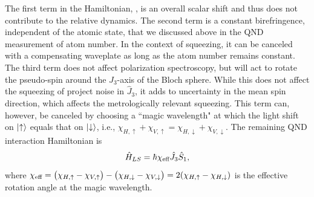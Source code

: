 \documentclass[preprint,aps,pra,onecolumn]{revtex4-1} %
\begin{document}
The first term in the Hamiltonian, , is an overall scalar shift and thus does not contribute to the relative dynamics.  The second term is a constant birefringence, independent of the atomic state, that we discussed above in the QND measurement of atom number.  In the context of squeezing, it can be canceled with a compensating waveplate as long as the atom number remains constant. The third term does not affect polarization spectroscopy, but will act to rotate the pseudo-spin around the $J_3$-axis of the Bloch sphere.  While this does not affect the squeezing of project noise in $\hat{J}_3$, it adds to uncertainty in the mean spin direction, which affects the metrologically relevant squeezing.   This term can, however, be canceled by choosing a ``magic wavelength" at which the light shift on $\lvert{\uparrow}\rangle$ equals that on $\lvert{\downarrow}\rangle$, i.e., 
$\chi_{H,\uparrow} +\chi_{V,\uparrow}  = \chi_{H,\downarrow} + \chi_{V,\downarrow}.$ The remaining QND interaction Hamiltonian is
\begin{equation}
\hat{H}_{LS} = \hbar \chi_{\text{eff}} \hat{J}_3 \hat{S}_1,
\end{equation}
where $\chi_{\text{eff}} = \big( \chi_{H, \uparrow} - \chi_{V,\uparrow} \big) - \big(\chi_{H,\downarrow} - \chi_{V,\downarrow} \big) = 2(\chi_{H, \uparrow}-\chi_{H, \downarrow})$ is the effective rotation angle at the magic wavelength.
\end{document}
